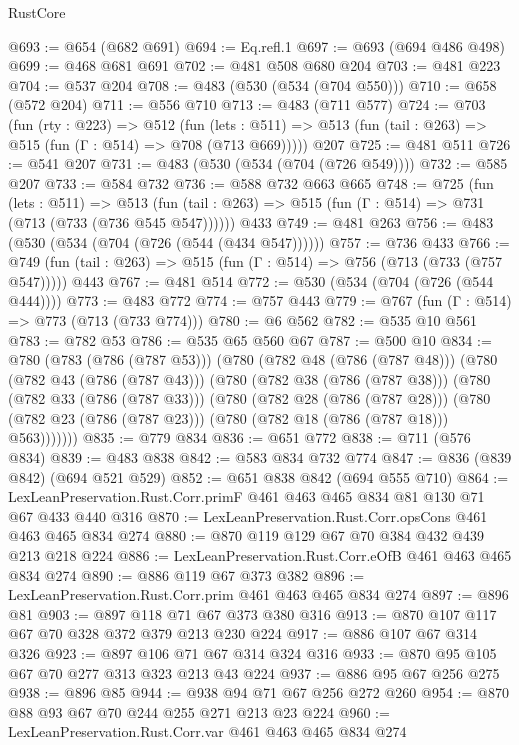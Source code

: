 \begin{lexlean}{RustCore}
\begin{coremodule}
@693 := @654 (@682 @691)
@694 := Eq.refl.{1}
@697 := @693 (@694 @486 @498)
@699 := @468 @681 @691
@702 := @481 @508 @680 @204
@703 := @481 @223
@704 := @537 @204
@708 := @483 (@530 (@534 (@704 @550)))
@710 := @658 (@572 @204)
@711 := @556 @710
@713 := @483 (@711 @577)
@724 := @703
    (fun (rty : @223) =>
    @512
      (fun (lets : @511) => @513 (fun (tail : @263) => @515 (fun (Γ : @514) => @708 (@713 @669)))))
    @207
@725 := @481 @511
@726 := @541 @207
@731 := @483 (@530 (@534 (@704 (@726 @549))))
@732 := @585 @207
@733 := @584 @732
@736 := @588 @732 @663 @665
@748 := @725
    (fun (lets : @511) =>
    @513 (fun (tail : @263) => @515 (fun (Γ : @514) => @731 (@713 (@733 (@736 @545 @547))))))
    @433
@749 := @481 @263
@756 := @483 (@530 (@534 (@704 (@726 (@544 (@434 @547))))))
@757 := @736 @433
@766 := @749 (fun (tail : @263) => @515 (fun (Γ : @514) => @756 (@713 (@733 (@757 @547))))) @443
@767 := @481 @514
@772 := @530 (@534 (@704 (@726 (@544 @444))))
@773 := @483 @772
@774 := @757 @443
@779 := @767 (fun (Γ : @514) => @773 (@713 (@733 @774)))
@780 := @6 @562
@782 := @535 @10 @561
@783 := @782 @53
@786 := @535 @65 @560 @67
@787 := @500 @10
@834 := @780
    (@783 (@786 (@787 @53)))
    (@780
      (@782 @48 (@786 (@787 @48)))
      (@780
        (@782 @43 (@786 (@787 @43)))
        (@780
          (@782 @38 (@786 (@787 @38)))
          (@780
            (@782 @33 (@786 (@787 @33)))
            (@780
              (@782 @28 (@786 (@787 @28)))
              (@780 (@782 @23 (@786 (@787 @23))) (@780 (@782 @18 (@786 (@787 @18))) @563)))))))
@835 := @779 @834
@836 := @651 @772
@838 := @711 (@576 @834)
@839 := @483 @838
@842 := @583 @834 @732 @774
@847 := @836 (@839 @842) (@694 @521 @529)
@852 := @651 @838 @842 (@694 @555 @710)
@864 := LexLeanPreservation.Rust.Corr.primF @461 @463 @465 @834 @81 @130 @71 @67 @433 @440 @316
@870 := LexLeanPreservation.Rust.Corr.opsCons @461 @463 @465 @834 @274
@880 := @870 @119 @129 @67 @70 @384 @432 @439 @213 @218 @224
@886 := LexLeanPreservation.Rust.Corr.eOfB @461 @463 @465 @834 @274
@890 := @886 @119 @67 @373 @382
@896 := LexLeanPreservation.Rust.Corr.prim @461 @463 @465 @834 @274
@897 := @896 @81
@903 := @897 @118 @71 @67 @373 @380 @316
@913 := @870 @107 @117 @67 @70 @328 @372 @379 @213 @230 @224
@917 := @886 @107 @67 @314 @326
@923 := @897 @106 @71 @67 @314 @324 @316
@933 := @870 @95 @105 @67 @70 @277 @313 @323 @213 @43 @224
@937 := @886 @95 @67 @256 @275
@938 := @896 @85
@944 := @938 @94 @71 @67 @256 @272 @260
@954 := @870 @88 @93 @67 @70 @244 @255 @271 @213 @23 @224
@960 := LexLeanPreservation.Rust.Corr.var @461 @463 @465 @834 @274

\end{coremodule}
\end{lexlean}
